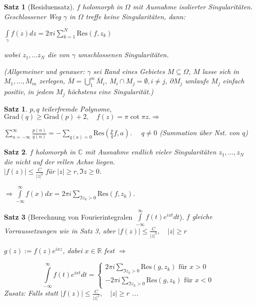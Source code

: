 \documentclass[ngerman,halfparskip]{scrartcl}
\newtheorem*{satz}{Satz}
\newtheorem*{satz*}{Satz}
\theoremstyle{definition}
\def\R{\mathbb R}
\def\C{\mathbb C}
\def\Res{\text{Res}}
\begin{document}
\begin{satz*}[Residuensatz]
$f$ holomorph in $\Omega$ mit Ausnahme isolierter Singularitäten. Geschlossener Weg $\gamma$ in $\Omega$ treffe keine Singularitäten, dann:

$\int\limits_\gamma f(z) dz=2\pi i \sum\limits_{k=1}^N \Res (f,z_k)$

wobei $z_1,\ldots z_N$ die von $\gamma$ umschlossenen Singularitäten. 

(Allgemeiner und genauer: $\gamma$ sei Rand eines Gebietes $M\subseteq \Omega$, $M$ lasse sich in $M_1,\ldots,M_m$ zerlegen, $\overline M=\bigcup\limits _1^m\overline M_i,~M_i\cap M_j=\emptyset, i\neq j, ~\partial M_j$ umlaufe $M_j$ einfach positiv, in jedem $M_j$ höchstens eine Singularität.)
\end{satz*}

\begin{satz}
$p,q$ teilerfremde Polynome, $\text{Grad}(q)\geq \text{Grad}(p)+2,\quad f(z)=\pi\cot\pi z. \Rightarrow$

$\sum\limits_{n=-\infty}^\infty \frac{p(n)}{q(n)}=-\sum_{q(a)=0}\Res(\frac pq f,a)$. $\quad q\neq 0$ (Summation über Nst. von $q$)
\end{satz}

\begin{satz}
$f$ holomorph in $\C$ mit Ausnahme endlich vieler Singularitäten $z_1,\ldots,z_N$ die nicht auf der rellen Achse liegen. \\
$|f(z)|\leq \frac C{|z|^2}$ für $|z|\geq r, \Im z\geq 0$.

$\Rightarrow \int\limits_{-\infty}^\infty f(x)dx=2\pi i \sum\limits_{\Im z_k >0}\Res (f,z_k)$.

\end{satz}

\begin{satz}[Berechnung von Fourierintegralen $\int\limits_{-\infty}^\infty f(t)e^{ixt}dt$]
$f$ gleiche Vorraussetzungen wie in Satz 3, aber $|f(z)|\leq \frac C{|z|^2}, \quad |z|\geq r$

$g(z):=f(z)e^{ixz}$, dabei $x\in\R$ fest $\Rightarrow$

$$\int\limits_{-\infty}^\infty f(t)e^{ixt}dt=\begin{cases}
2\pi i \sum\limits_{\Im z_k>0}\Res(g,z_k) \text{ für } x>0\\
-2\pi i \sum\limits_{\Im z_k>0}\Res(g,z_k) \text{ für } x<0
\end{cases}$$
Zusatz: Falls statt $|f(z)|\leq \frac C{|z|^2}, \quad |z|\geq r$ ...
\end{satz}
\end{document}
